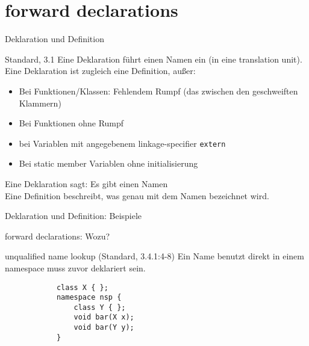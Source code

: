 \section{forward declarations}

\begin{frame}[fragile]{Deklaration und Definition}
	\begin{block}{Standard, 3.1}
		Eine Deklaration führt einen Namen ein (in eine translation unit).
		Eine Deklaration ist zugleich eine Definition, außer:
		\begin{itemize}
			\item Bei Funktionen/Klassen: Fehlendem Rumpf {\tiny (das zwischen den geschweiften Klammern) }
			\item Bei Funktionen ohne Rumpf
			\item bei Variablen mit angegebenem linkage-specifier \verb|extern|
			\item Bei static member Variablen ohne initialisierung
		\end{itemize}
	\end{block}
	
	\vspace{1em}
	
	\uncover<+->
	{
		Eine Deklaration sagt: Es gibt einen Namen \\
		Eine Definition beschreibt, was genau mit dem Namen bezeichnet wird.
	}
\end{frame}


\begin{frame}{Deklaration und Definition: Beispiele}
	\onslide*<+>
		
\end{frame}


\begin{frame}[fragile]{forward declarations: Wozu?}
	\begin{block}{unqualified name lookup (Standard, 3.4.1:4-8)}
		Ein Name benutzt direkt in einem namespace muss zuvor deklariert sein.
		
		\vspace{1em}
		
		\begin{lstlisting}
			class X { };
			namespace nsp {
			    class Y { };
			    void bar(X x);
			    void bar(Y y);
			}
		\end{lstlisting}
	\end{block}
\end{frame}


